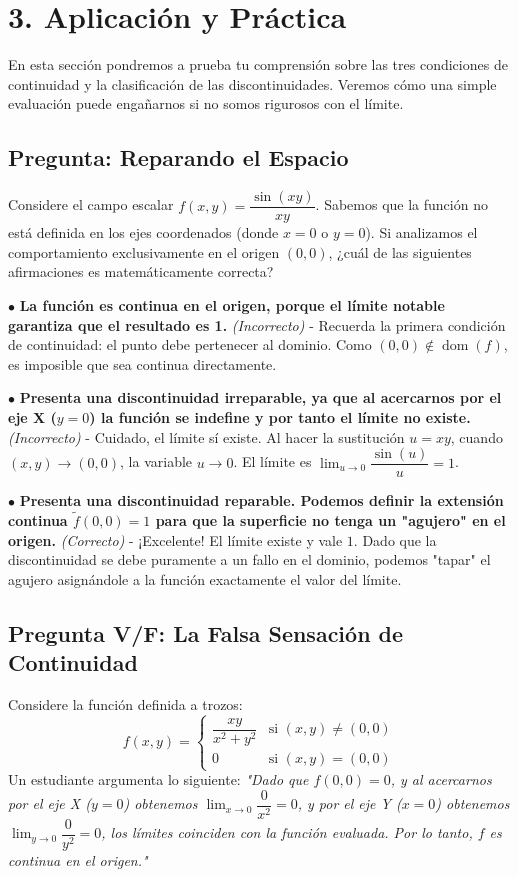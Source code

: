 \documentclass[11pt]{article}
\newenvironment{aplicacion}{%
  \section*{3. Aplicación y Práctica}%
}{}
\newenvironment{preguntaalternativas}[1]{\subsection*{Pregunta: #1}\par\vspace{0.1cm}}{\vspace{0.3cm}}
\newcommand{\opcion}[3]{\par\noindent $\bullet$ \textbf{#1} \textit{(#2)} - #3\par\vspace{0.15cm}}
\newenvironment{preguntaverdaderofalso}[1]{\subsection*{Pregunta V/F: #1}\par\vspace{0.1cm}}{\vspace{0.3cm}}
\begin{document}
\begin{aplicacion}
  En esta sección pondremos a prueba tu comprensión sobre las tres condiciones de continuidad y la clasificación de las discontinuidades. Veremos cómo una simple evaluación puede engañarnos si no somos rigurosos con el límite.

  \begin{preguntaalternativas}{Reparando el Espacio}
    Considere el campo escalar $f(x,y) = \dfrac{\sin(xy)}{xy}$. Sabemos que la función no está definida en los ejes coordenados (donde $x=0$ o $y=0$). Si analizamos el comportamiento exclusivamente en el origen $(0,0)$, ¿cuál de las siguientes afirmaciones es matemáticamente correcta?
    
    \opcion{La función es continua en el origen, porque el límite notable garantiza que el resultado es 1.}{Incorrecto}{Recuerda la primera condición de continuidad: el punto debe pertenecer al dominio. Como $(0,0) \notin \operatorname{dom}(f)$, es imposible que sea continua directamente.}
    \opcion{Presenta una discontinuidad irreparable, ya que al acercarnos por el eje X ($y=0$) la función se indefine y por tanto el límite no existe.}{Incorrecto}{Cuidado, el límite sí existe. Al hacer la sustitución $u = xy$, cuando $(x,y) \to (0,0)$, la variable $u \to 0$. El límite es $\displaystyle \lim_{u\to 0}\dfrac{\sin(u)}{u} = 1$.}
    \opcion{Presenta una discontinuidad reparable. Podemos definir la extensión continua $\tilde{f}(0,0) = 1$ para que la superficie no tenga un "agujero" en el origen.}{Correcto}{¡Excelente! El límite existe y vale $1$. Dado que la discontinuidad se debe puramente a un fallo en el dominio, podemos "tapar" el agujero asignándole a la función exactamente el valor del límite.}
  \end{preguntaalternativas}

  \begin{preguntaverdaderofalso}{La Falsa Sensación de Continuidad}
    Considere la función definida a trozos:
    $$ f(x,y) = \begin{cases} \dfrac{xy}{x^2+y^2} & \text{si } (x,y) \neq (0,0) \\ 0 & \text{si } (x,y) = (0,0) \end{cases} $$
    Un estudiante argumenta lo siguiente: \textit{"Dado que $f(0,0) = 0$, y al acercarnos por el eje X ($y=0$) obtenemos $\displaystyle \lim_{x\to 0} \dfrac{0}{x^2} = 0$, y por el eje Y ($x=0$) obtenemos $\displaystyle \lim_{y\to 0} \dfrac{0}{y^2} = 0$, los límites coinciden con la función evaluada. Por lo tanto, $f$ es continua en el origen."}
    

\end{preguntaverdaderofalso}
\end{aplicacion}
\end{document}
